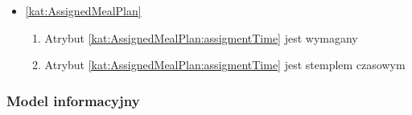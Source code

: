 \begin{itemize}[label={\textbf{Ograniczenia dla}}, wide, labelwidth=!, labelindent=0pt]
%

    \item\ref{kat:AssignedMealPlan}\mynobreakpar
    \begin{enumerate}[label={\textbf{OGR/4/\protect\twodigits{\arabic{enumi}}}}, wide, labelwidth=!, align=left, leftmargin=3cm, resume]
        \item Atrybut \ref{kat:AssignedMealPlan:assigmentTime} jest wymagany

        \item Atrybut \ref{kat:AssignedMealPlan:assigmentTime} jest stemplem czasowym
    \end{enumerate}
\end{itemize}

\subsubsection{Model informacyjny}\label{subsubsec:database:appointments:domainModel}


\thispagestyle{normal}
